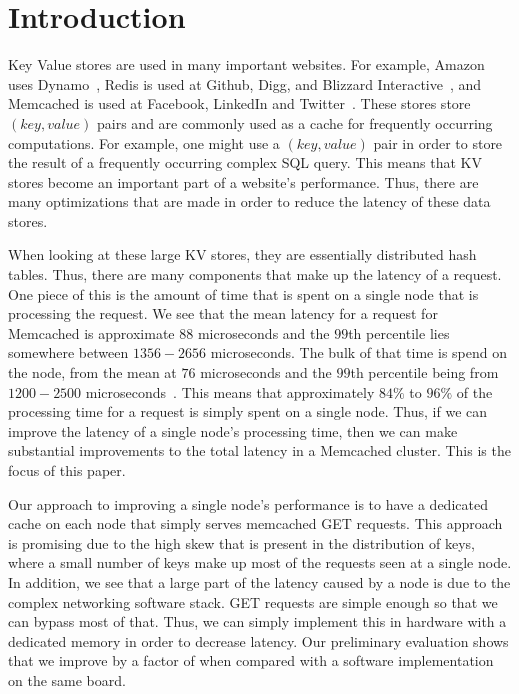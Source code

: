\section{Introduction}
Key Value stores are used in many important websites. For example, Amazon uses
Dynamo~\cite{dynamo}, Redis is used at Github, Digg, and Blizzard
Interactive~\cite{Reddi10}, and Memcached is used at Facebook, LinkedIn and
Twitter~\cite{memcached, Petrovic08}. These stores store $(key, value)$ pairs and are
commonly used as a cache for frequently occurring computations. For example,
one might use a $(key, value)$ pair in order to store the result of a
frequently occurring complex SQL query. This means that KV stores become an
important part of a website's performance. Thus, there are many optimizations
that are made in order to reduce the latency of these data stores.

When looking at these large KV stores, they are essentially distributed hash
tables. Thus, there are many components that make up the latency of a request.
One piece of this is the amount of time that is spent on a single node that is
processing the request. We see that the mean latency for a request for
Memcached is approximate $88$ microseconds and the $99$th percentile lies
somewhere between $1356-2656$ microseconds. The bulk of that time is spend on
the node, from the mean at $76$ microseconds and the $99$th percentile being
from $1200-2500$ microseconds~\cite{Kapoor2012}. This means that approximately
$84\%$ to $96\%$ of the processing time for a request is simply spent on a
single node. Thus, if we can improve the latency of a single node's processing
time, then we can make substantial improvements to the total latency in a
Memcached cluster. This is the focus of this paper.

Our approach to improving a single node's performance is to have a dedicated
cache on each node that simply serves memcached GET requests. This approach is
promising due to the high skew that is present in the distribution of keys,
where a small number of keys make up most of the requests seen at a single
node. In addition, we see that a large part of the latency caused by a node is
due to the complex networking software stack. GET requests are simple enough so
that we can bypass most of that. Thus, we can simply implement this in hardware
with a dedicated memory in order to decrease latency. Our preliminary
evaluation shows that we improve by a factor of 
when compared with a software implementation on the same board.
